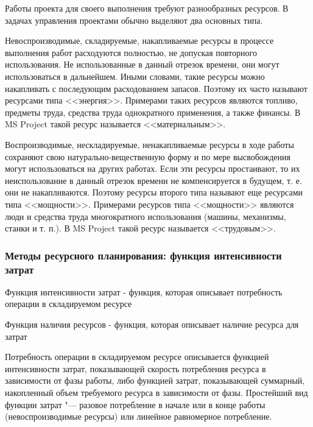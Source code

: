 \documentclass{../industrial-development}
\begin{document}
Работы проекта для своего выполнения требуют разнообразных ресурсов. В задачах управления проектами обычно выделяют два основных типа.

Невоспроизводимые, складируемые, накапливаемые ресурсы в процессе выполнения работ расходуются полностью, не допуская повторного использования.
Не использованные в данный отрезок времени, они могут использоваться в дальнейшем. Иными словами, такие ресурсы можно накапливать с последующим расходованием запасов. Поэтому их часто называют ресурсами типа <<энергия>>. Примерами таких ресурсов являются топливо, предметы труда, средства труда однократного применения, а также финансы. В MS Project такой ресурс называется <<материальным>>.

Воспроизводимые, нескладируемые, ненакапливаемые ресурсы в ходе работы сохраняют свою натурально-вещественную форму и по мере высвобождения могут использоваться на других работах. Если эти ресурсы простаивают, то их неиспользование в данный отрезок времени не компенсируется в будущем, т. е. они не накапливаются. Поэтому ресурсы второго типа называют еще ресурсами типа <<мощности>>. Примерами ресурсов типа <<мощности>> являются люди и средства труда многократного использования (машины, механизмы, станки и т. п.). В MS Project такой ресурс называется <<трудовым>>.

    \begin{frame} \frametitle{Методы ресурсного планирования: функция интенсивности затрат}
        \begin{definition}
            \alert{Функция интенсивности затрат} - функция, которая описывает потребность операции в складируемом ресурсе
        \end{definition}

\vspace{0.5cm}

        \begin{definition}
            \alert{Функция наличия ресурсов} - функция, которая описывает наличие ресурса для затрат
        \end{definition}
    \end{frame}
    \lecturenotes 

Потребность операции в складируемом ресурсе описывается функцией интенсивности затрат, показывающей скорость потребления ресурса в зависимости от фазы работы, либо функцией затрат, показывающей суммарный, накопленный объем требуемого ресурса в зависимости от фазы. Простейший вид функции затрат "--- разовое потребление в начале или в конце работы (невоспроизводимые ресурсы) или линейное равномерное потребление. 
\end{document}
